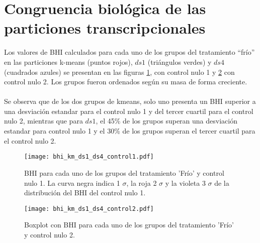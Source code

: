 \section{Congruencia biológica de las particiones transcripcionales}
Los valores de BHI calculados para cada uno de los grupos del tratamiento ``frío'' en las particiones k-means (puntos rojos), $ds1$ (triángulos verdes) y $ds4$ (cuadrados azules) se presentan en las figuras \ref{fig:bhi_km_ds1_ds4_control1}, con control nulo 1 y \ref{fig:bhi_km_ds1_ds4_control2} con control nulo 2. Los grupos fueron ordenados según su masa de forma creciente.\\\\
Se observa que de los dos grupos de kmeans, solo uno presenta un BHI superior a una desviación estandar para el control nulo 1 y del tercer cuartil para el control nulo 2, mientras que para $ds1$, el 45\% de los grupos superan una desviación estandar para control nulo 1 y el 30\% de los grupos superan el tercer cuartil para el control nulo 2.\\
\begin{figure*}[t!]
    \centering
    \begin{subfigure}[t]{0.7\textwidth}
    \centering
    \texttt{[image: bhi\_km\_ds1\_ds4\_control1.pdf]}
    \caption{BHI para cada uno de los grupos del tratamiento 'Frío' y control nulo 1. 
	La curva negra indica 1 $\sigma$, la roja 2 $\sigma$ y la violeta 3 $\sigma$ de la distribución del BHI del control nulo 1.}
    \label{fig:bhi_km_ds1_ds4_control1}
    \end{subfigure}
    \begin{subfigure}[t]{0.7\textwidth}
    \centering
    \texttt{[image: bhi\_km\_ds1\_ds4\_control2.pdf]}
    \caption{Boxplot con BHI para cada uno de los grupos del tratamiento 'Frío' y control nulo 2.}
    \label{fig:bhi_km_ds1_ds4_control2}
    \end{subfigure}
    \caption{Índice de Homogeneidad Biológica, BHI, para cada uno de los grupos del tratamiento 'Frío' obtenidos con k-means (puntos rojos), $ds1$ (triángulos verdes), $ds4$ (cuadrados azules) y controles nulos. Los grupos fueron ordenados según su masa de forma creciente.}
\end{figure*}

